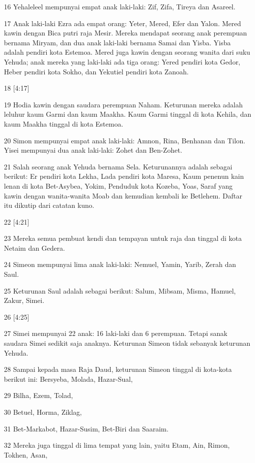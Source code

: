 \par 16 Yehaleleel mempunyai empat anak laki-laki: Zif, Zifa, Tireya dan Asareel.
\par 17 Anak laki-laki Ezra ada empat orang: Yeter, Mered, Efer dan Yalon. Mered kawin dengan Bica putri raja Mesir. Mereka mendapat seorang anak perempuan bernama Miryam, dan dua anak laki-laki bernama Samai dan Yisba. Yisba adalah pendiri kota Estemoa. Mered juga kawin dengan seorang wanita dari suku Yehuda; anak mereka yang laki-laki ada tiga orang: Yered pendiri kota Gedor, Heber pendiri kota Sokho, dan Yekutiel pendiri kota Zanoah.
\par 18 [4:17]
\par 19 Hodia kawin dengan saudara perempuan Naham. Keturunan mereka adalah leluhur kaum Garmi dan kaum Maakha. Kaum Garmi tinggal di kota Kehila, dan kaum Maakha tinggal di kota Estemoa.
\par 20 Simon mempunyai empat anak laki-laki: Amnon, Rina, Benhanan dan Tilon. Yisei mempunyai dua anak laki-laki: Zohet dan Ben-Zohet.
\par 21 Salah seorang anak Yehuda bernama Sela. Keturunannya adalah sebagai berikut: Er pendiri kota Lekha, Lada pendiri kota Maresa, Kaum penenun kain lenan di kota Bet-Asybea, Yokim, Penduduk kota Kozeba, Yoas, Saraf yang kawin dengan wanita-wanita Moab dan kemudian kembali ke Betlehem. Daftar itu dikutip dari catatan kuno.
\par 22 [4:21]
\par 23 Mereka semua pembuat kendi dan tempayan untuk raja dan tinggal di kota Netaim dan Gedera.
\par 24 Simeon mempunyai lima anak laki-laki: Nemuel, Yamin, Yarib, Zerah dan Saul.
\par 25 Keturunan Saul adalah sebagai berikut: Salum, Mibsam, Misma, Hamuel, Zakur, Simei.
\par 26 [4:25]
\par 27 Simei mempunyai 22 anak: 16 laki-laki dan 6 perempuan. Tetapi sanak saudara Simei sedikit saja anaknya. Keturunan Simeon tidak sebanyak keturunan Yehuda.
\par 28 Sampai kepada masa Raja Daud, keturunan Simeon tinggal di kota-kota berikut ini: Bersyeba, Molada, Hazar-Sual,
\par 29 Bilha, Ezem, Tolad,
\par 30 Betuel, Horma, Ziklag,
\par 31 Bet-Markabot, Hazar-Susim, Bet-Biri dan Saaraim.
\par 32 Mereka juga tinggal di lima tempat yang lain, yaitu Etam, Ain, Rimon, Tokhen, Asan,
